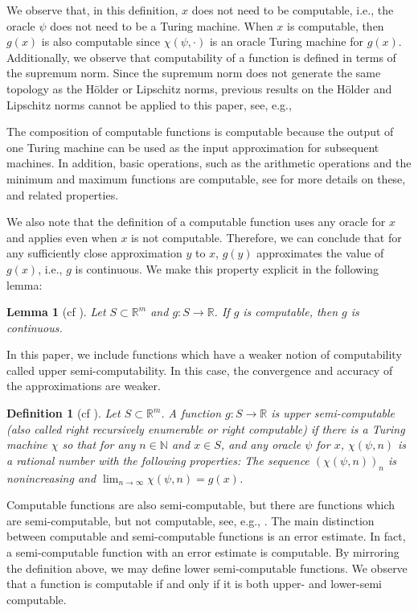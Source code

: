 \documentclass[11pt, reqno]{amsart}
\newtheorem{definition}[theorem]{Definition}
\newtheorem{lemma}[theorem]{Lemma}
\newcommand{\bR}{{\mathbb R}}
\newcommand{\bN}{{\mathbb N}}
\begin{document}
We observe that, in this definition, $x$ does not need to be computable, i.e., the oracle $\psi$ does not need to be a Turing machine.  When $x$ is computable, then $g(x)$ is also computable since $\chi(\psi,\cdot)$ is an oracle Turing machine for $g(x)$.  Additionally, we observe that computability of a function is defined in terms of the supremum norm.  Since the supremum norm does not generate the same topology as the H\"older or Lipschitz norms, previous results on the H\"older and Lipschitz norms cannot be applied to this paper, see, e.g., \cite{C,CLT,M,QS}

The composition of computable functions is computable because the output of one Turing machine can be used as the input approximation for subsequent machines.  In addition, basic operations, such as the arithmetic operations and the minimum and maximum functions are computable, see \cite{BHW} for more details on these, and related properties.

We also note that the definition of a computable function uses any oracle for $x$ and applies even when $x$ is not computable.  Therefore, we can conclude that for any sufficiently close approximation $y$ to $x$, $g(y)$ approximates the value of $g(x)$, i.e., $g$ is continuous.  We make this property explicit in the following lemma:

\begin{lemma}[cf {\cite[Theorem 1.5]{BY}}]
Let $S\subset \bR^m$ and $g:S\rightarrow\bR$.  If $g$ is computable, then $g$ is continuous.
\end{lemma}

In this paper, we include functions which have a weaker notion of computability called upper semi-computability.  In this case, the convergence and accuracy of the approximations are weaker.

\begin{definition}[cf {\cite[Definition 2.7]{GHR}}]
Let $S\subset\bR^m$.  A function $g:S\rightarrow\bR$ is {\em upper semi-computable} (also called right recursively enumerable or right computable) if there is a Turing machine $\chi$ so that for any $n\in \bN$ and $x\in S$, and any oracle $\psi$ for $x$, $\chi(\psi,n)$ is a rational number with the following properties: The sequence $(\chi(\psi,n))_n$ is nonincreasing and $\lim_{n\rightarrow\infty}\chi(\psi,n)=g(x)$.
\end{definition}

Computable functions are also semi-computable, but there are functions which are semi-computable, but not computable, see, e.g., \cite{BY}.  The main distinction between computable and semi-computable functions is an error estimate.  In fact, a semi-computable function with an error estimate is computable.  By mirroring the definition above, we may define lower semi-computable functions.  We observe that a function is computable if and only if it is both upper- and lower-semi computable.  
\end{document}
